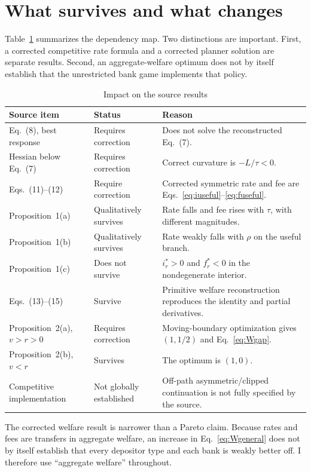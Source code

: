 \section{What survives and what changes}
Table~\ref{tab:impact} summarizes the dependency map. Two distinctions are important. First, a corrected competitive rate formula and a corrected planner solution are separate results. Second, an aggregate-welfare optimum does not by itself establish that the unrestricted bank game implements that policy.

\begin{table}[ht]
\centering
\caption{Impact on the source results}\label{tab:impact}
\small
\begin{tabular}{p{}p{}p{}}
\toprule
Source item & Status & Reason \\
\midrule
Eq.~(8), best response & Requires correction & Does not solve the reconstructed Eq.~(7). \\
Hessian below Eq.~(7) & Requires correction & Correct curvature is $-L/\tau<0$. \\
Eqs.~(11)--(12) & Require correction & Corrected symmetric rate and fee are Eqs.~\eqref{eq:iuseful}--\eqref{eq:fuseful}. \\
Proposition~1(a) & Qualitatively survives & Rate falls and fee rises with $\tau$, with different magnitudes. \\
Proposition~1(b) & Qualitatively survives & Rate weakly falls with $\rho$ on the useful branch. \\
Proposition~1(c) & Does not survive & $i_r^*>0$ and $f_r^*<0$ in the nondegenerate interior. \\
Eqs.~(13)--(15) & Survive & Primitive welfare reconstruction reproduces the identity and partial derivatives. \\
Proposition~2(a), $v>r>0$ & Requires correction & Moving-boundary optimization gives $(1,1/2)$ and Eq.~\eqref{eq:Wgap}. \\
Proposition~2(b), $v<r$ & Survives & The optimum is $(1,0)$. \\
Competitive implementation & Not globally established & Off-path asymmetric/clipped continuation is not fully specified by the source. \\
\bottomrule
\end{tabular}
\end{table}

The corrected welfare result is narrower than a Pareto claim. Because rates and fees are transfers in aggregate welfare, an increase in Eq.~\eqref{eq:Wgeneral} does not by itself establish that every depositor type and each bank is weakly better off. I therefore use “aggregate welfare” throughout.

